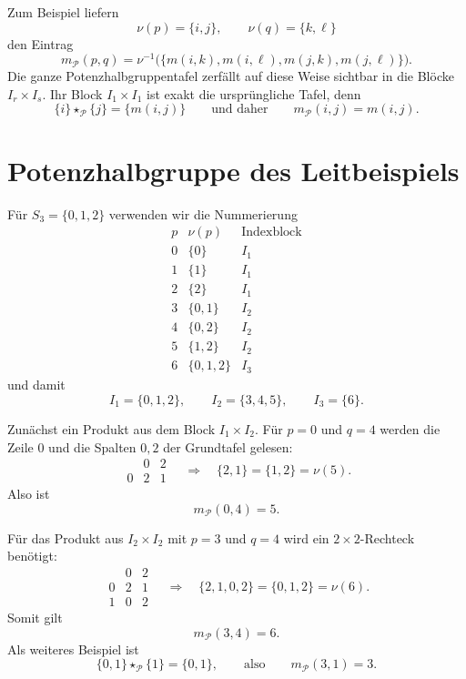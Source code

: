\documentclass[main.tex]{subfiles}
\begin{document}
Zum Beispiel liefern
\[
  \nu(p)=\{i,j\},
  \qquad
  \nu(q)=\{k,\ell\}
\]
den Eintrag
\[
  m_{\mathcal P}(p,q)
  =
  \nu^{-1}\!\bigl(
    \{m(i,k),m(i,\ell),m(j,k),m(j,\ell)\}
  \bigr).
\]
Die ganze Potenzhalbgruppentafel zerfällt auf diese Weise sichtbar in die
Blöcke \(I_r\times I_s\).  Ihr Block \(I_1\times I_1\) ist exakt die
ursprüngliche Tafel, denn
\[
  \{i\}\star_{\mathcal P}\{j\}=\{m(i,j)\}
  \qquad\text{und daher}\qquad
  m_{\mathcal P}(i,j)=m(i,j).
\]


\section{Potenzhalbgruppe des Leitbeispiels}

Für \(S_3=\{0,1,2\}\) verwenden wir die Nummerierung
\[
\begin{array}{c|c|c}
p&\nu(p)&\text{Indexblock}\\\hline
0&\{0\}&I_1\\
1&\{1\}&I_1\\
2&\{2\}&I_1\\\hline
3&\{0,1\}&I_2\\
4&\{0,2\}&I_2\\
5&\{1,2\}&I_2\\\hline
6&\{0,1,2\}&I_3
\end{array}
\]
und damit
\[
  I_1=\{0,1,2\},
  \qquad
  I_2=\{3,4,5\},
  \qquad
  I_3=\{6\}.
\]

Zunächst ein Produkt aus dem Block \(I_1\times I_2\).  Für \(p=0\) und
\(q=4\) werden die Zeile \(0\) und die Spalten \(0,2\) der Grundtafel
gelesen:
\[
\begin{array}{c|cc}
&0&2\\\hline
0&2&1
\end{array}
\quad\Longrightarrow\quad
\{2,1\}=\{1,2\}=\nu(5).
\]
Also ist
\[
  m_{\mathcal P}(0,4)=5.
\]

Für das Produkt aus \(I_2\times I_2\) mit \(p=3\) und \(q=4\) wird ein
\(2\times2\)-Rechteck benötigt:
\[
\begin{array}{c|cc}
&0&2\\\hline
0&2&1\\
1&0&2
\end{array}
\quad\Longrightarrow\quad
\{2,1,0,2\}=\{0,1,2\}=\nu(6).
\]
Somit gilt
\[
  m_{\mathcal P}(3,4)=6.
\]
Als weiteres Beispiel ist
\[
  \{0,1\}\star_{\mathcal P}\{1\}=\{0,1\},
  \qquad\text{also}\qquad
  m_{\mathcal P}(3,1)=3.
\]
\end{document}
